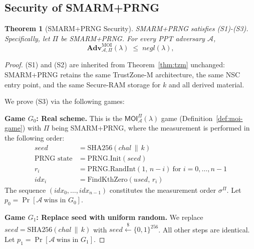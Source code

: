 \documentclass{ieeeaccess}
\newcommand{\rtsmarmone}{SMARM+PRNG\xspace}
\newtheorem{theorem}{Theorem}[section]
\newcommand{\Adv}{\mathbf{Adv}}
\begin{document}
\subsection{Security of \rtsmarmone}
\label{sec:proof-prng}
 
\begin{theorem}[\rtsmarmone Security]
\label{thm:prng}
SMARM+PRNG satisfies (S1)-(S3).
Specifically, let $\Pi$ be \rtsmarmone. For every PPT adversary $\mathcal{A}$,
\[
  \Adv^{\mathrm{MOI}}_{\mathcal{A},\Pi}(\lambda) \;\leq\; \mathit{negl}(\lambda),
\]
\end{theorem}
 
\begin{proof}
(S1) and (S2) are inherited from Theorem~\ref{thm:tzm} unchanged:
SMARM+PRNG retains the same TrustZone-M architecture, the same NSC entry
point, and the same Secure-RAM storage for $k$ and all derived material.
 
We prove (S3) via the following games:
 
\medskip
\noindent\textbf{Game $G_0$: Real scheme.}
This is the $\mathsf{MOI}^\Pi_{\mathcal{A}}(\lambda)$ game
(Definition~\ref{def:moi-game}) with $\Pi$ being \rtsmarmone, where the measurement is performed in the following order:
\begin{align*}
  \mathit{seed}    &= \mathrm{SHA256}(\mathit{chal} \,\|\, k) \\
  \text{PRNG state} &= \mathrm{PRNG.Init}(\mathit{seed}) \\
  r_i              &= \mathrm{PRNG.RandInt}(1,\, n-i)
                      \ \text{for } i = 0,\dots,n-1 \\
  \mathit{idx}_i   &= \mathrm{FindKthZero}(\mathit{used},\, r_i)
\end{align*}
The sequence $(\mathit{idx}_0,\dots,\mathit{idx}_{n-1})$ constitutes the
measurement order $\sigma^\Pi$.
Let $p_0 = \Pr[\mathcal{A}\ \text{wins in } G_0]$.
 
\medskip
\noindent\textbf{Game $G_1$: Replace seed with uniform random.}
We replace $\mathit{seed} = \mathrm{SHA256}(\mathit{chal} \,\|\, k)$ with
$\mathit{seed} \xleftarrow{\$} \{0,1\}^{256}$.
All other steps are identical.
Let $p_1 = \Pr[\mathcal{A}\ \text{wins in } G_1]$.
 

\end{proof}
\end{document}
